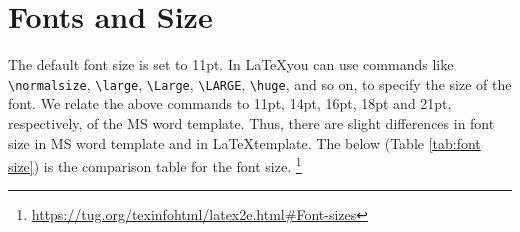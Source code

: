\documentclass[11pt]{report}
\begin{document}
\section{Fonts and Size}\label{sec:font}

The default font size is set to 11pt.
In \LaTeX you can use commands like \verb|\normalsize|, \verb|\large|, \verb|\Large|, \verb|\LARGE|, \verb|\huge|, and so on, to specify the size of the font.
We relate the above commands to 11pt, 14pt, 16pt, 18pt and 21pt, respectively, of the MS word template.
Thus, there are slight differences in font size in MS word template and in \LaTeX template.
The below (Table \ref{tab:font size}) is the comparison table for the font size.
\footnote{\url{https://tug.org/texinfohtml/latex2e.html#Font-sizes}}

\bigskip

\end{document}
